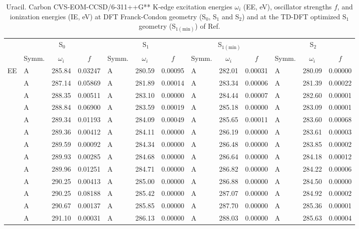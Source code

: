 \documentclass[journal=jctcce,manuscript=article]{achemso}
\begin{document}
\begin{table}
\caption{Uracil.  Carbon CVS-EOM-CCSD/6-311++G** K-edge excitation energies $\omega_i$ (EE, eV), oscillator strengths $f$, and ionization energies (IE, eV) at DFT Franck-Condon geometry (S$_0$, S$_1$ and S$_2$) and at the TD-DFT optimized S$_1$ geometry (S$_{1(\text{min})}$) of Ref.
\label{Tab:Uracil_DFT}}
\scriptsize
\begin{tabular}{l|lcc|lcc|lcc|lcc}
\cline{2-13}
& \multicolumn{3}{c|}{S$_0$}
& \multicolumn{3}{c|}{S$_1$}  
& \multicolumn{3}{c|}{S$_{1(\text{min})}$}
& \multicolumn{3}{c}{S$_2$}
\\
\cline{2-13}
& Symm. & $\omega_i$ & $f$ 
& Symm. & $\omega_i$ & $f$ 
& Symm. & $\omega_i$ & $f$ 
& Symm. & $\omega_i$ & $f$\\
\hline
  EE 
& A & 285.84 & 0.03247 & A & 280.59 & 0.00095 & A & 282.01 & 0.00031 & A & 280.09 & 0.00000 \\ 
& A & 287.14 & 0.05869 & A & 281.89 & 0.00014 & A & 283.34 & 0.00006 & A & 281.39 & 0.00022 \\ 
& A & 288.35 & 0.00511 & A & 283.10 & 0.00000 & A & 284.44 & 0.00007 & A & 282.60 & 0.00001 \\ 
& A & 288.84 & 0.06900 & A & 283.59 & 0.00019 & A & 285.18 & 0.00000 & A & 283.09 & 0.00001 \\ 
& A & 289.34 & 0.01193 & A & 284.09 & 0.00049 & A & 285.65 & 0.00011 & A & 283.60 & 0.00068 \\ 
& A & 289.36 & 0.00412 & A & 284.11 & 0.00000 & A & 286.19 & 0.00000 & A & 283.61 & 0.00003 \\ 
& A & 289.59 & 0.00092 & A & 284.34 & 0.00000 & A & 286.48 & 0.00000 & A & 283.85 & 0.00002 \\ 
& A & 289.93 & 0.00285 & A & 284.68 & 0.00000 & A & 286.64 & 0.00000 & A & 284.18 & 0.00012 \\ 
& A & 289.96 & 0.01251 & A & 284.71 & 0.00000 & A & 286.82 & 0.00000 & A & 284.22 & 0.00006 \\ 
& A & 290.25 & 0.00413 & A & 285.00 & 0.00000 & A & 286.88 & 0.00000 & A & 284.50 & 0.00000 \\ 
& A & 290.25 & 0.08188 & A & 285.42 & 0.00000 & A & 287.07 & 0.00000 & A & 284.92 & 0.00002 \\ 
& A & 290.67 & 0.00137 & A & 285.85 & 0.00000 & A & 287.70 & 0.00000 & A & 285.36 & 0.00001 \\ 
& A & 291.10 & 0.00031 & A & 286.13 & 0.00000 & A & 288.03 & 0.00000 & A & 285.63 & 0.00004 \\ 

\end{tabular}
\end{table}
\end{document}
